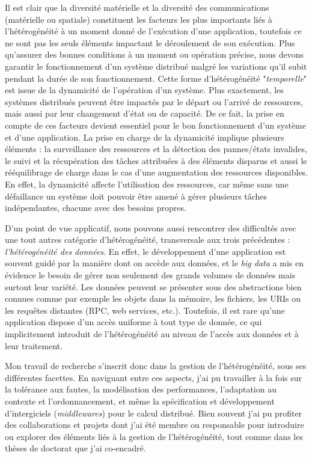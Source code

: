 Il est clair que la diversité matérielle et la diversité des communications (matérielle ou spatiale) constituent les facteurs les plus importants liés à l'hétérogénéité à un moment donné de l'exécution d'une application, toutefois ce ne sont pas les seuls éléments impactant le déroulement de son exécution. Plus qu'assurer des bonnes conditions à un moment ou opération précise, nous devons garantir le fonctionnement d'un système distribué malgré les variations qu'il subit pendant la durée de son fonctionnement. Cette forme d'hétérogénéité "\textit{temporelle}" est issue de la dynamicité de l'opération d'un système. Plus exactement, les systèmes distribués peuvent être impactés par le départ ou l'arrivé de ressources, mais aussi par leur changement d'état ou de capacité. De ce fait, la prise en compte de ces facteurs devient essentiel pour le bon fonctionnement d'un système et d'une application. La prise en charge de la dynamicité implique plusieurs éléments : la surveillance des ressources et la détection des pannes/états invalides, le suivi et la récupération des tâches attribuées à des éléments disparus et aussi le rééquilibrage de charge dans le cas d'une augmentation des ressources disponibles. En effet, la dynamicité affecte l'utilisation des ressources, car même sans une défaillance un système doit pouvoir être amené à gérer plusieurs tâches indépendantes, chacune avec des besoins propres.

D'un point de vue applicatif, nous pouvons aussi rencontrer des difficultés avec une tout autres catégorie d'hétérogénéité, transversale aux trois précédentes :\textit{ l'hétérogénéité des données}. En effet, le développement d'une application est souvent guidé par la manière dont on accède aux données, et le \textit{big data} a mis en évidence le besoin de gérer non seulement des grands volumes de données mais surtout leur variété. Les données peuvent se présenter sous des abstractions bien connues comme par exemple les objets dans la mémoire, les fichiers, les URIs ou les requêtes distantes (RPC, web services, etc.). Toutefois, il est rare qu'une application dispose d'un accès uniforme à tout type de donnée, ce qui implicitement introduit de l'hétérogénéité au niveau de l'accès aux données et à leur traitement. 

Mon travail de recherche s'inscrit donc dans la gestion de l'hétérogénéité, sous ses différentes facettes. En naviguant entre ces aspects, j'ai pu travailler à la fois sur la tolérance aux fautes, la modélisation des performances, l'adaptation au contexte et l'ordonnancement, et même la spécification et développement d'intergiciels (\textit{middlewares}) pour le calcul distribué. Bien souvent j'ai pu profiter des collaborations et projets dont j'ai été membre ou responsable pour introduire ou explorer des éléments liés à la gestion de l'hétérogénéité, tout comme dans les thèses de doctorat que j'ai co-encadré. 


